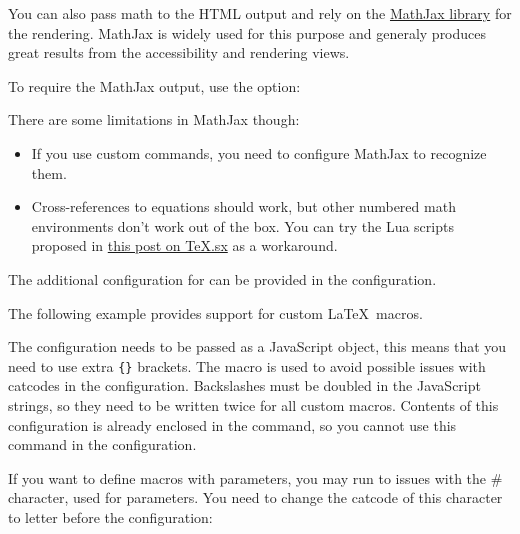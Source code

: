 You can also pass math to the HTML output and rely on the \href{https://www.mathjax.org/}{MathJax
library} for the rendering. 
MathJax is widely used for this purpose and generaly produces great results
from the accessibility and rendering views. 

To require the MathJax output, use the  option:



There are some limitations in MathJax though:

\begin{itemize}
  \item If you use custom commands, you need to configure MathJax to recognize them.

  \item Cross-references to equations should work, but other numbered math environments
    don't work out of the box. You can try the Lua scripts proposed in 
    \href{https://tex.stackexchange.com/a/597913/2891}{this post on TeX.sx} as
    a workaround.
\end{itemize}

The additional configuration for  can be provided in the
 configuration.

The following example provides support for custom \LaTeX\ macros.

\begin{texsource}

\EndPreamble
\end{texsource}


The configuration needs to be passed as a JavaScript object, this means that
you need to use extra \verb|{}| brackets.
The \texcommand{\detokenize} macro is used to avoid possible issues with catcodes
in the configuration. Backslashes must be doubled in the
JavaScript strings, so they need to be written twice for all custom macros.
Contents of this configuration is already enclosed in the
\texcommand{\HCode} command, so you cannot use this command in the configuration.

If you want to define macros with parameters, you may run to issues with the \# character, used for parameters.
You need to change the catcode of this character to letter before the  configuration:

